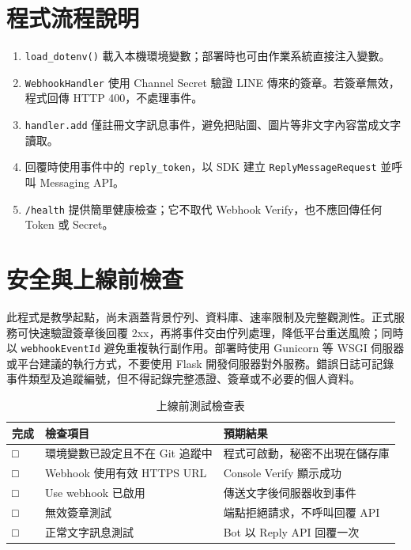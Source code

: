 \documentclass[12pt,a4paper]{report}
\begin{document}
\section{程式流程說明}
\begin{enumerate}
  \item \texttt{load\_dotenv()} 載入本機環境變數；部署時也可由作業系統直接注入變數。
  \item \texttt{WebhookHandler} 使用 Channel Secret 驗證 LINE 傳來的簽章。若簽章無效，程式回傳 HTTP 400，不處理事件。
  \item \texttt{handler.add} 僅註冊文字訊息事件，避免把貼圖、圖片等非文字內容當成文字讀取。
  \item 回覆時使用事件中的 \texttt{reply\_token}，以 SDK 建立 \texttt{ReplyMessageRequest} 並呼叫 Messaging API。
  \item \texttt{/health} 提供簡單健康檢查；它不取代 Webhook Verify，也不應回傳任何 Token 或 Secret。
\end{enumerate}

\section{安全與上線前檢查}
此程式是教學起點，尚未涵蓋背景佇列、資料庫、速率限制及完整觀測性。正式服務可快速驗證簽章後回覆 2xx，再將事件交由佇列處理，降低平台重送風險；同時以 \texttt{webhookEventId} 避免重複執行副作用。部署時使用 Gunicorn 等 WSGI 伺服器或平台建議的執行方式，不要使用 Flask 開發伺服器對外服務。錯誤日誌可記錄事件類型及追蹤編號，但不得記錄完整憑證、簽章或不必要的個人資料。

\begin{table}[htbp]
\centering
\caption{上線前測試檢查表}
\label{tab:checklist}
\begin{tabularx}{\textwidth}{>{\centering\arraybackslash}p{1.3cm} X X}
\toprule
完成 & 檢查項目 & 預期結果 \\
\midrule
□ & 環境變數已設定且不在 Git 追蹤中 & 程式可啟動，秘密不出現在儲存庫 \\
□ & Webhook 使用有效 HTTPS URL & Console Verify 顯示成功 \\
□ & Use webhook 已啟用 & 傳送文字後伺服器收到事件 \\
□ & 無效簽章測試 & 端點拒絕請求，不呼叫回覆 API \\
□ & 正常文字訊息測試 & Bot 以 Reply API 回覆一次 \\
\bottomrule
\end{tabularx}
\end{table}
\end{document}
